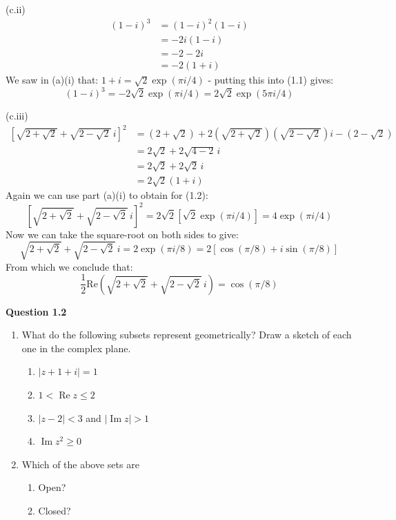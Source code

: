 \documentclass[12pt,a4paper]{article}
\newcommand{\question}[2]{\textbf{Question #1}\quad #2}
\begin{document}
(c.ii)
\begin{align*}
(1-i)^3 &= (1-i)^2(1-i) \\
&= -2i(1-i) \\
&= -2-2i \\
&= -2(1+i) \tag{1.1}
\end{align*}
We saw in (a)(i) that: $1 + i = \sqrt{2} \exp(\pi i/4)$ - putting this into (1.1) gives:
$$(1-i)^3 = -2\sqrt{2} \exp{(\pi i/4)} = 2\sqrt{2} \exp{(5\pi i/4)}$$

(c.iii)
\begin{align*}
\left[\sqrt{2+\sqrt{2}}+\sqrt{2-\sqrt{2}}\,i\right]^2
&= (2+\sqrt{2})+2\left(\sqrt{2+\sqrt{2}}\right)\left(\sqrt{2-\sqrt{2}}\right)i-(2-\sqrt{2}) \\
&= 2\sqrt{2}+2\sqrt{4-2}\,i \\
&= 2\sqrt{2}+2\sqrt{2}\,i \\
&= 2\sqrt{2}(1+i) \tag{1.2}
\end{align*}
Again we can use part (a)(i) to obtain for (1.2):
$$\left[\sqrt{2+\sqrt{2}}+\sqrt{2-\sqrt{2}}\,i\right]^2 = 2\sqrt{2} [\sqrt{2} \exp(\pi i/4)] = 4 \exp(\pi i/4)$$ 
Now we can take the square-root on both sides to give:
$$\sqrt{2+\sqrt{2}}+\sqrt{2-\sqrt{2}}\,i = 2 \exp(\pi i/8) = 2[\cos(\pi/8) + i \sin(\pi/8)]$$
From which we conclude that:
$$\frac{1}{2}\text{Re}\left(\sqrt{2+\sqrt{2}}+\sqrt{2-\sqrt{2}}\,i\right) = \cos(\pi/8)$$
\newpage

\newpage

\question{1.2}{
\begin{enumerate}
\item[(a)] What do the following subsets represent geometrically? Draw a sketch of each one in the complex plane.

\begin{enumerate}
\item[(i)] $|z+1+i|=1$
\item[(ii)] $1<\operatorname{Re} z\leq 2$
\item[(iii)] $|z-2|<3$ and $|\operatorname{Im} z|>1$
\item[(iv)] $\operatorname{Im} z^2\geq 0$
\end{enumerate}

\item[(b)] Which of the above sets are

\begin{enumerate}
\item[(i)] Open?
\item[(ii)] Closed?
\end{enumerate}
\end{enumerate}
}
\end{document}
